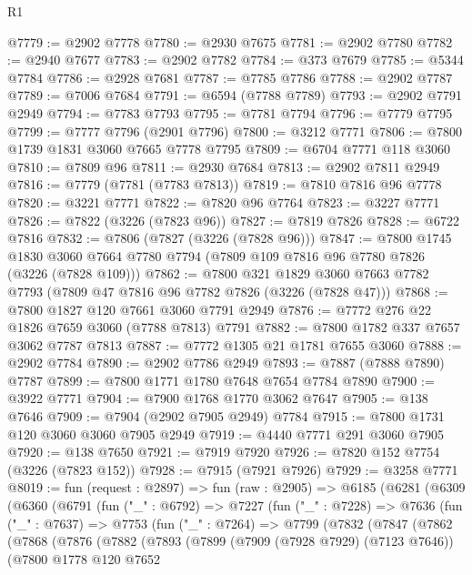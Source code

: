 \begin{lexlean}{R1}
\begin{coremodule}
@7779 := @2902 @7778
@7780 := @2930 @7675
@7781 := @2902 @7780
@7782 := @2940 @7677
@7783 := @2902 @7782
@7784 := @373 @7679
@7785 := @5344 @7784
@7786 := @2928 @7681
@7787 := @7785 @7786
@7788 := @2902 @7787
@7789 := @7006 @7684
@7791 := @6594 (@7788 @7789)
@7793 := @2902 @7791 @2949
@7794 := @7783 @7793
@7795 := @7781 @7794
@7796 := @7779 @7795
@7799 := @7777 @7796 (@2901 @7796)
@7800 := @3212 @7771
@7806 := @7800 @1739 @1831 @3060 @7665 @7778 @7795
@7809 := @6704 @7771 @118 @3060
@7810 := @7809 @96
@7811 := @2930 @7684
@7813 := @2902 @7811 @2949
@7816 := @7779 (@7781 (@7783 @7813))
@7819 := @7810 @7816 @96 @7778
@7820 := @3221 @7771
@7822 := @7820 @96 @7764
@7823 := @3227 @7771
@7826 := @7822 (@3226 (@7823 @96))
@7827 := @7819 @7826
@7828 := @6722 @7816
@7832 := @7806 (@7827 (@3226 (@7828 @96)))
@7847 := @7800
    @1745
    @1830
    @3060
    @7664
    @7780
    @7794
    (@7809 @109 @7816 @96 @7780 @7826 (@3226 (@7828 @109)))
@7862 := @7800
    @321
    @1829
    @3060
    @7663
    @7782
    @7793
    (@7809 @47 @7816 @96 @7782 @7826 (@3226 (@7828 @47)))
@7868 := @7800 @1827 @120 @7661 @3060 @7791 @2949
@7876 := @7772 @276 @22 @1826 @7659 @3060 (@7788 @7813) @7791
@7882 := @7800 @1782 @337 @7657 @3062 @7787 @7813
@7887 := @7772 @1305 @21 @1781 @7655 @3060
@7888 := @2902 @7784
@7890 := @2902 @7786 @2949
@7893 := @7887 (@7888 @7890) @7787
@7899 := @7800 @1771 @1780 @7648 @7654 @7784 @7890
@7900 := @3922 @7771
@7904 := @7900 @1768 @1770 @3062 @7647
@7905 := @138 @7646
@7909 := @7904 (@2902 @7905 @2949) @7784
@7915 := @7800 @1731 @120 @3060 @3060 @7905 @2949
@7919 := @4440 @7771 @291 @3060 @7905
@7920 := @138 @7650
@7921 := @7919 @7920
@7926 := @7820 @152 @7754 (@3226 (@7823 @152))
@7928 := @7915 (@7921 @7926)
@7929 := @3258 @7771
@8019 := fun (request : @2897) =>
  fun (raw : @2905) =>
  @6185
    (@6281
      (@6309
        (@6360
          (@6791
            (fun ("_" : @6792) =>
            @7227
              (fun ("_" : @7228) =>
              @7636
                (fun ("_" : @7637) =>
                @7753
                  (fun ("_" : @7264) =>
                  @7799
                    (@7832
                      (@7847
                        (@7862
                          (@7868
                            (@7876
                              (@7882
                                (@7893
                                  (@7899
                                    (@7909 (@7928 @7929) (@7123 @7646))
                                    (@7800
                                      @1778
                                      @120
                                      @7652

\end{coremodule}
\end{lexlean}
